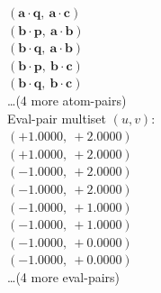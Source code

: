 \documentclass[a4paper,11pt]{article}
\newcommand{\pdcegfomjfhook}[2]{\mathbf{#1} \cdot \mathbf{#2}}
\begin{document}
$(\pdcegfomjfhook{a}{q},\ \pdcegfomjfhook{a}{c})$\\
$(\pdcegfomjfhook{b}{p},\ \pdcegfomjfhook{a}{b})$\\
$(\pdcegfomjfhook{b}{q},\ \pdcegfomjfhook{a}{b})$\\
$(\pdcegfomjfhook{b}{p},\ \pdcegfomjfhook{b}{c})$\\
$(\pdcegfomjfhook{b}{q},\ \pdcegfomjfhook{b}{c})$\\
\quad \ldots (4 more atom-pairs)\\
\quad Eval-pair multiset $(u, v)$:\\
$(+1.0000,\ +2.0000)$\\
$(+1.0000,\ +2.0000)$\\
$(-1.0000,\ +2.0000)$\\
$(-1.0000,\ +2.0000)$\\
$(-1.0000,\ +1.0000)$\\
$(-1.0000,\ +1.0000)$\\
$(-1.0000,\ +0.0000)$\\
$(-1.0000,\ +0.0000)$\\
\quad \ldots (4 more eval-pairs)\\
\end{document}
